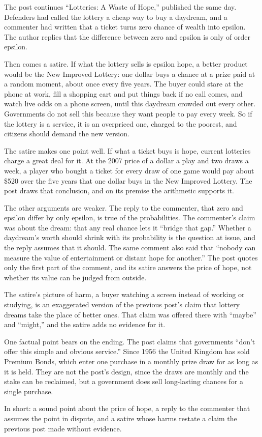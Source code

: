 \begin{afterword}
\summaryhead

The post continues ``Lotteries: A Waste of Hope,'' published the same day. Defenders had called the lottery a cheap way to buy a daydream, and a commenter had written that a ticket turns zero chance of wealth into epsilon. The author replies that the difference between zero and epsilon is only of order epsilon.

Then comes a satire. If what the lottery sells is epsilon hope, a better product would be the New Improved Lottery: one dollar buys a chance at a prize paid at a random moment, about once every five years. The buyer could stare at the phone at work, fill a shopping cart and put things back if no call comes, and watch live odds on a phone screen, until this daydream crowded out every other. Governments do not sell this because they want people to pay every week. So if the lottery is a service, it is an overpriced one, charged to the poorest, and citizens should demand the new version.

\responsehead

The satire makes one point well. If what a ticket buys is hope, current lotteries charge a great deal for it. At the 2007 price of a dollar a play and two draws a week, a player who bought a ticket for every draw of one game would pay about \$520 over the five years that one dollar buys in the New Improved Lottery. The post draws that conclusion, and on its premise the arithmetic supports it.

The other arguments are weaker. The reply to the commenter, that zero and epsilon differ by only epsilon, is true of the probabilities. The commenter's claim was about the dream: that any real chance lets it ``bridge that gap.'' Whether a daydream's worth should shrink with its probability is the question at issue, and the reply assumes that it should. The same comment also said that ``nobody can measure the value of entertainment or distant hope for another.'' The post quotes only the first part of the comment, and its satire answers the price of hope, not whether its value can be judged from outside.

The satire's picture of harm, a buyer watching a screen instead of working or studying, is an exaggerated version of the previous post's claim that lottery dreams take the place of better ones. That claim was offered there with ``maybe'' and ``might,'' and the satire adds no evidence for it.

One factual point bears on the ending. The post claims that governments ``don't offer this simple and obvious service.'' Since 1956 the United Kingdom has sold Premium Bonds, which enter one purchase in a monthly prize draw for as long as it is held. They are not the post's design, since the draws are monthly and the stake can be reclaimed, but a government does sell long-lasting chances for a single purchase.

In short: a sound point about the price of hope, a reply to the commenter that assumes the point in dispute, and a satire whose harms restate a claim the previous post made without evidence.
\end{afterword}
